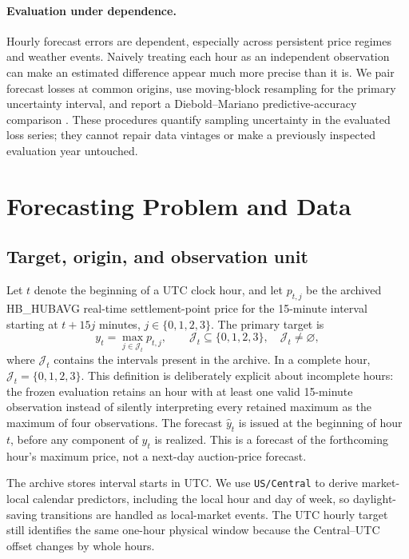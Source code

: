 \documentclass[11pt,letterpaper]{article}
\begin{document}
\paragraph{Evaluation under dependence.} Hourly forecast errors are dependent, especially across persistent price regimes and weather events. Naively treating each hour as an independent observation can make an estimated difference appear much more precise than it is. We pair forecast losses at common origins, use moving-block resampling for the primary uncertainty interval, and report a Diebold--Mariano predictive-accuracy comparison \citep{diebold1995,harvey1997}. These procedures quantify sampling uncertainty in the evaluated loss series; they cannot repair data vintages or make a previously inspected evaluation year untouched.

\section{Forecasting Problem and Data}\label{sec:data}
\subsection{Target, origin, and observation unit}
Let $t$ denote the beginning of a UTC clock hour, and let $p_{t,j}$ be the archived HB\_HUBAVG real-time settlement-point price for the 15-minute interval starting at $t+15j$ minutes, $j\in\{0,1,2,3\}$. The primary target is
\begin{equation}\label{eq:target}
  y_t = \max_{j\in\mathcal J_t}p_{t,j}, \qquad
  \mathcal J_t\subseteq\{0,1,2,3\},\quad \mathcal J_t\ne\varnothing,
\end{equation}
where $\mathcal J_t$ contains the intervals present in the archive. In a complete hour, $\mathcal J_t=\{0,1,2,3\}$. This definition is deliberately explicit about incomplete hours: the frozen evaluation retains an hour with at least one valid 15-minute observation instead of silently interpreting every retained maximum as the maximum of four observations. The forecast $\hat y_t$ is issued at the beginning of hour $t$, before any component of $y_t$ is realized. This is a forecast of the forthcoming hour's maximum price, not a next-day auction-price forecast.

The archive stores interval starts in UTC. We use \texttt{US/Central} to derive market-local calendar predictors, including the local hour and day of week, so daylight-saving transitions are handled as local-market events. The UTC hourly target still identifies the same one-hour physical window because the Central--UTC offset changes by whole hours.
\end{document}
